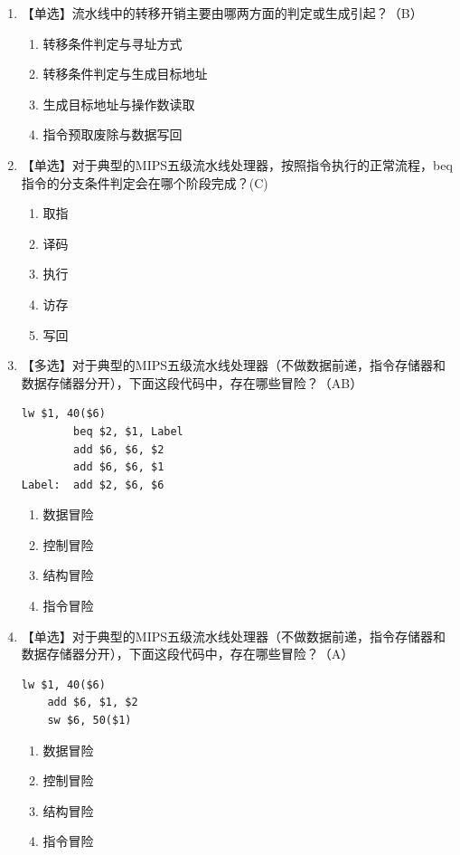 \documentclass[12pt, a4paper]{article}
\begin{document}
\begin{enumerate}[label=\arabic*.]
    \item 【单选】流水线中的转移开销主要由哪两方面的判定或生成引起？（B）
    \begin{enumerate}[label=\Alph*.]
        \item 转移条件判定与寻址方式 \item 转移条件判定与生成目标地址 
        \item 生成目标地址与操作数读取 \item 指令预取废除与数据写回 
    \end{enumerate}

    \item 【单选】对于典型的MIPS五级流水线处理器，按照指令执行的正常流程，beq指令的分支条件判定会在哪个阶段完成？(C)
    \begin{enumerate}[label=\Alph*.]
        \item 取指 \item 译码 \item 执行 \item 访存 \item 写回
    \end{enumerate}

     \item 【多选】对于典型的MIPS五级流水线处理器（不做数据前递，指令存储器和数据存储器分开），下面这段代码中，存在哪些冒险？（AB）
    \begin{center}
    \begin{BVerbatim}[frame=single, framesep=3mm]
        lw $1, 40($6)
        beq $2, $1, Label
        add $6, $6, $2 
        add $6, $6, $1 
Label:  add $2, $6, $6
    \end{BVerbatim}
    \end{center}
    \begin{enumerate}[label=\Alph*：]
        \item 数据冒险 \item 控制冒险 \item 结构冒险 \item 指令冒险
    \end{enumerate}

    \item 【单选】对于典型的MIPS五级流水线处理器（不做数据前递，指令存储器和数据存储器分开），下面这段代码中，存在哪些冒险？（A）
    \begin{center}
    \begin{BVerbatim}[frame=single, framesep=3mm]
    lw $1, 40($6)
    add $6, $1, $2
    sw $6, 50($1)
    \end{BVerbatim}
    \end{center}
    \begin{enumerate}[label=\Alph*：]
        \item 数据冒险 \item 控制冒险 \item 结构冒险 \item 指令冒险
    \end{enumerate}


\end{enumerate}
\end{document}

